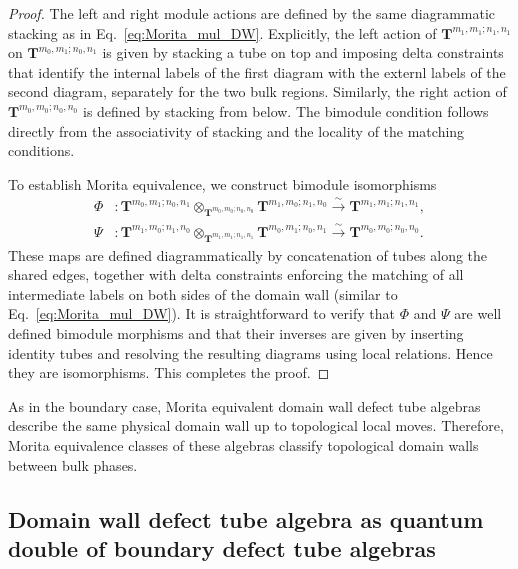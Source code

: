 \documentclass[a4paper,11pt]{article}
\theoremstyle{definition}
\theoremstyle{remark}
\begin{document}
\begin{proof}
The left and right module actions are defined by the same diagrammatic stacking as in Eq.~\eqref{eq:Morita_mul_DW}. 
Explicitly, the left action of $\mathbf{T}^{m_1,m_1;n_1,n_1}$ on $\mathbf{T}^{m_0,m_1;n_0,n_1}$ is given by stacking a tube on top and imposing delta constraints that identify the internal labels of the first diagram with the externl labels of the second diagram, separately for the two bulk regions. 
Similarly, the right action of $\mathbf{T}^{m_0,m_0;n_0,n_0}$ is defined by stacking from below.
The bimodule condition follows directly from the associativity of stacking and the locality of the matching conditions.

To establish Morita equivalence, we construct bimodule isomorphisms
\begin{align}
\Phi&:\mathbf{T}^{m_0,m_1;n_0,n_1}\otimes_{\mathbf{T}^{m_0,m_0;n_0,n_0}}\mathbf{T}^{m_1,m_0;n_1,n_0} \xrightarrow{\sim} \mathbf{T}^{m_1,m_1;n_1,n_1}, \\
\Psi&:\mathbf{T}^{m_1,m_0;n_1,n_0}\otimes_{\mathbf{T}^{m_1,m_1;n_1,n_1}}\mathbf{T}^{m_0,m_1;n_0,n_1} \xrightarrow{\sim} \mathbf{T}^{m_0,m_0;n_0,n_0}.
\end{align}
These maps are defined diagrammatically by concatenation of tubes along the shared edges, together with delta constraints enforcing the matching of all intermediate labels on both sides of the domain wall (similar to Eq.~\eqref{eq:Morita_mul_DW}). 
It is straightforward to verify that $\Phi$ and $\Psi$ are well defined bimodule morphisms and that their inverses are given by inserting identity tubes and resolving the resulting diagrams using local relations. Hence they are isomorphisms.
This completes the proof.
\end{proof}

As in the boundary case, Morita equivalent domain wall defect tube algebras describe the same physical domain wall up to topological local moves. Therefore, Morita equivalence classes of these algebras classify topological domain walls between bulk phases.




\subsection{Domain wall defect tube algebra as quantum double of boundary defect tube algebras}
\end{document}
